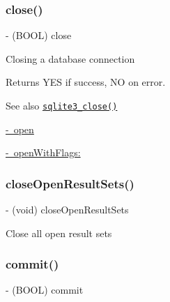 \subsubsection{\texorpdfstring{close()}{close()}}
{\footnotesize\ttfamily -\/ (B\+O\+OL) close \begin{DoxyParamCaption}{ }\end{DoxyParamCaption}}

Closing a database connection

\begin{DoxyReturn}{Returns}
{\ttfamily Y\+ES} if success, {\ttfamily NO} on error.
\end{DoxyReturn}
\begin{DoxySeeAlso}{See also}
\href{http://sqlite.org/c3ref/close.html}{\tt sqlite3\+\_\+close()} 

\mbox{\hyperlink{interface_o_p_t_l_y_f_m_d_b_database_afc3b896f0808f555b09064bb6d514f93}{-\/ open}} 

\mbox{\hyperlink{interface_o_p_t_l_y_f_m_d_b_database_a088fc6d53b7e5b2713d5cacef74807ad}{-\/ open\+With\+Flags\+:}} 
\end{DoxySeeAlso}
\mbox{\label{interface_o_p_t_l_y_f_m_d_b_database_a7b1edc77522099779f49fa74fcfe0036}} 
\subsubsection{\texorpdfstring{close\+Open\+Result\+Sets()}{closeOpenResultSets()}}
{\footnotesize\ttfamily -\/ (void) close\+Open\+Result\+Sets \begin{DoxyParamCaption}{ }\end{DoxyParamCaption}}

Close all open result sets \mbox{\label{interface_o_p_t_l_y_f_m_d_b_database_a13149a1989b1cdb7a6f7b8f2b4207cfd}} 
\subsubsection{\texorpdfstring{commit()}{commit()}}
{\footnotesize\ttfamily -\/ (B\+O\+OL) commit \begin{DoxyParamCaption}{ }\end{DoxyParamCaption}}

